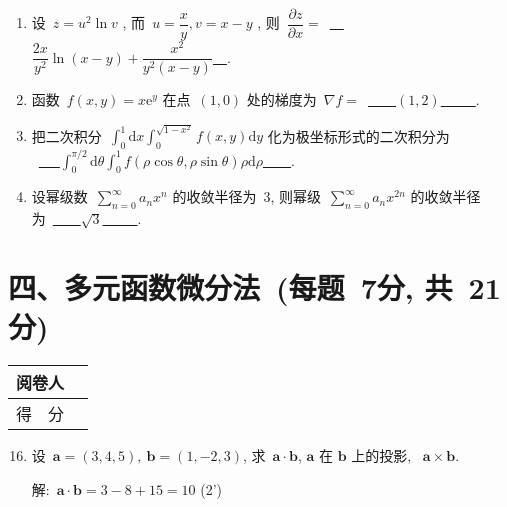 \documentclass[twocolumn,landscape,UTF8]{ctexart}
\newcommand{\putzdx}{\marginpar{
		\parbox{1cm}{\vspace{-1.6cm}
			\rotatebox[origin=c]{90}{
				\usebox{\zdx}
		}}
}}
\newcommand{\me}{\mathrm{e}}  %
\newcommand{\dif}{\mathrm{d}}
\newcommand{\bs}{\boldsymbol}%
\newcommand{\ds}{\displaystyle}
\begin{document}
\begin{spacing}{1.3}
\begin{enumerate}
			\item 设~$z = u^2\ln v$ , 而~$u= \dfrac{x}{y}, v = x-y$ , 则~$\dfrac{\partial z}{\partial x}= $~\underline{~~$\dfrac{2x}{y^2}\ln(x-y)+\dfrac{x^2}{y^2(x-y)}$~~}.
			
			\item 函数~$f(x,y) = x\me^y$ 在点~$(1,0)$ 处的梯度为~$\nabla f = $~\underline{~~~~$(1,2)$~~~~~}.
			\item 把二次积分~$\displaystyle{\int_0^1 \dif x \int_0^{\sqrt{1-x^2}} f(x,y) \dif y}$ 化为极坐标形式的二次积分为\\
			~\underline{~~~$\displaystyle{\int_0^{\pi/2} \dif \theta \int_0^1 f(\rho \cos\theta, \rho\sin\theta)\rho \dif \rho}$~~~~}.
			
			\item 设幂级数~$\sum\limits_{n=0}^\infty a_nx^n$ 的收敛半径为~$3$, 则幂级~$\sum\limits_{n=0}^\infty a_nx^{2n}$ 的收敛半径为~\underline{~~~~$\sqrt{3}$~~~~~}.
		\end{enumerate}
		
		\newpage
		\putzdx %
		
		\section*{\hspace{5cm} 四、多元函数微分法~(每题~7分, 共~21分)}
		\vspace{-2cm}
		\begin{tabular}{|p{}|p{}|}
			\hline
			\centering  阅卷人&  \\
			\hline
			\centering 得~~分 &  \\
			\hline
		\end{tabular}
		\begin{enumerate}\setcounter{enumi}{15}
		\item 设~$\bs{a}=(3,4,5),~\bs{b}=(1,-2,3)$, 求~$\bs{a}\cdot\bs{b}$, $\bs{a}$ 在 $ \bs{b}$ 上的投影, ~$\bs{a}\times\bs{b}$.
		\vspace{1cm}
		
		解:~$\bs{a}\cdot\bs{b} = 3-8+15=10$ \dotfill{}(2')
		

\end{enumerate}
\end{spacing}
\end{document}
